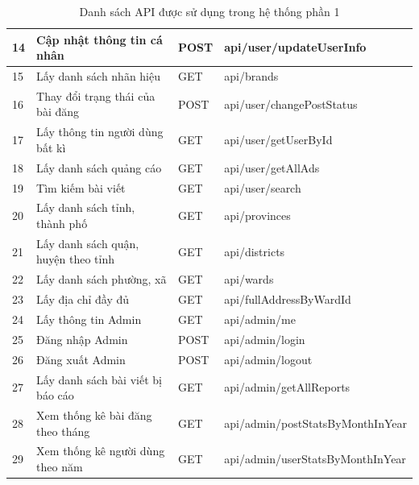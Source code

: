 \documentclass[../DoAn.tex]{subfiles}
\begin{document}
\begin{table}[H]
\begin{tabular}{|p{1cm}|p{5.5cm}|p{1.5cm}|p{6.5cm}|}
14  & Cập nhật thông tin cá nhân                           & POST        & api/user/updateUserInfo           \\ \hline
15  & Lấy danh sách nhãn hiệu                              & GET         & api/brands                        \\ \hline
16  & Thay đổi trạng thái của bài đăng                     & POST        & api/user/changePostStatus         \\ \hline
17  & Lấy thông tin người dùng bất kì                      & GET         & api/user/getUserById              \\ \hline
18  & Lấy danh sách quảng cáo                              & GET         & api/user/getAllAds                \\ \hline
19  & Tìm kiếm bài viết                                    & GET         & api/user/search                   \\ \hline
20  & Lấy danh sách tỉnh, thành phố                        & GET         & api/provinces                     \\ \hline
21  & Lấy danh sách quận, huyện theo tỉnh                  & GET         & api/districts                     \\ \hline
22  & Lấy danh sách phường, xã                             & GET         & api/wards                         \\ \hline
23  & Lấy địa chỉ đầy đủ                                   & GET         & api/fullAddressByWardId           \\ \hline
24  & Lấy thông tin Admin                                  & GET         & api/admin/me                      \\ \hline
25  & Đăng nhập Admin                                      & POST        & api/admin/login                   \\ \hline
26  & Đăng xuất Admin                                      & POST        & api/admin/logout                  \\ \hline
27  & Lấy danh sách bài viết bị báo cáo                    & GET         & api/admin/getAllReports           \\ \hline
28  & Xem thống kê bài đăng theo tháng                     & GET         & api/admin/postStatsByMonthInYear  \\ \hline
29  & Xem thống kê người dùng theo năm                     & GET         & api/admin/userStatsByMonthInYear  \\ \hline
\end{tabular}
\caption{Danh sách API được sử dụng trong hệ thống phần 1}
\label{tab:my-table}
\end{table}
\end{document}
